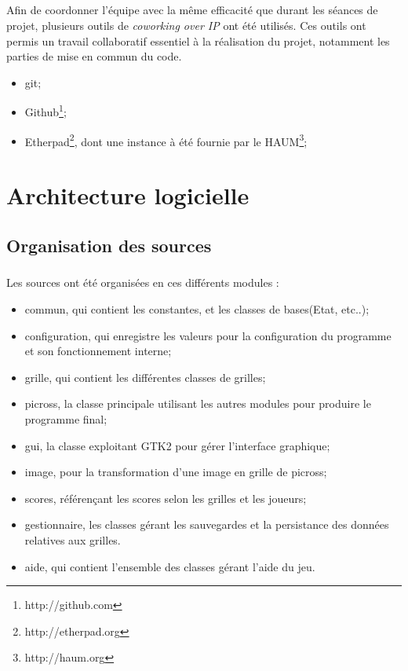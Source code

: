         \paragraph*{}
         Afin de coordonner l'équipe avec la même efficacité que durant les séances de projet, plusieurs outils de \textit{coworking over IP} ont  été utilisés.
Ces outils ont permis un travail collaboratif essentiel à la réalisation du projet, notamment les parties de mise en commun du code.
        \begin{itemize}
                \item git;
                \item Github\footnote{http://github.com};
                \item Etherpad\footnote{http://etherpad.org}, dont une instance à été fournie par le HAUM\footnote{http://haum.org};
        \end{itemize}






\chapter{Architecture logicielle}


\section{Organisation des sources}
        \paragraph*{}
   Les sources ont été organisées en ces différents modules :
    \begin{itemize}
             \item commun, qui contient les constantes, et les classes de bases(Etat, etc..);
             \item configuration, qui enregistre les valeurs pour la configuration du programme et son fonctionnement interne;
             \item grille, qui contient les différentes classes de grilles;
             \item picross, la classe principale utilisant les autres modules pour produire le programme final;
             \item gui, la classe exploitant GTK2 pour gérer l'interface graphique;
             \item image, pour la transformation d'une image en grille de picross;
             \item scores, référençant les scores selon les grilles et les joueurs;
             \item gestionnaire, les classes gérant les sauvegardes et la persistance des données relatives aux grilles. %
             \item aide, qui contient l'ensemble des classes gérant l'aide du jeu.
        \end{itemize}
        
